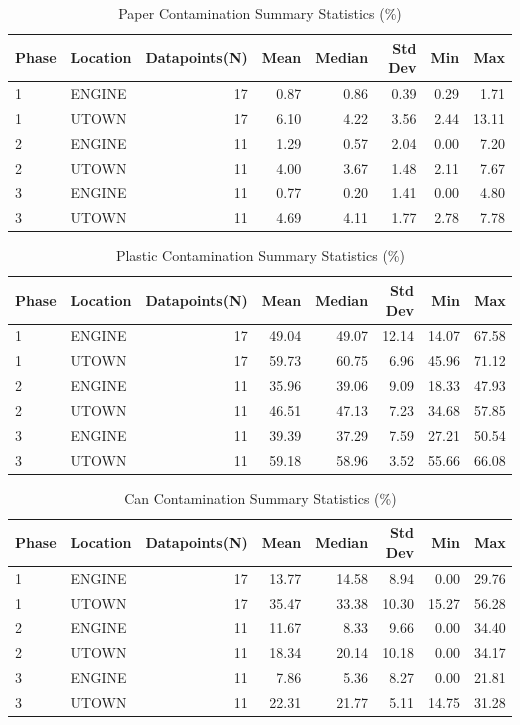 \documentclass[12pt]{article}
\begin{document}
\begin{table}[H]
\centering
\caption{Paper Contamination Summary Statistics (\%)}
\label{tab:paper}
\small
\begin{tabular}{llrrrrrr}
\toprule
Phase & Location & Datapoints(N) & Mean & Median & Std Dev & Min & Max \\
\midrule
1 & ENGINE & 17 & 0.87 & 0.86 & 0.39 & 0.29 & 1.71 \\
1 & UTOWN & 17 & 6.10 & 4.22 & 3.56 & 2.44 & 13.11 \\
2 & ENGINE & 11 & 1.29 & 0.57 & 2.04 & 0.00 & 7.20 \\
2 & UTOWN & 11 & 4.00 & 3.67 & 1.48 & 2.11 & 7.67 \\
3 & ENGINE & 11 & 0.77 & 0.20 & 1.41 & 0.00 & 4.80 \\
3 & UTOWN & 11 & 4.69 & 4.11 & 1.77 & 2.78 & 7.78 \\
\bottomrule
\end{tabular}
\end{table}

\begin{table}[H]
\centering
\caption{Plastic Contamination Summary Statistics (\%)}
\label{tab:plastic}
\small
\begin{tabular}{llrrrrrr}
\toprule
Phase & Location & Datapoints(N) & Mean & Median & Std Dev & Min & Max \\
\midrule
1 & ENGINE & 17 & 49.04 & 49.07 & 12.14 & 14.07 & 67.58 \\
1 & UTOWN & 17 & 59.73 & 60.75 & 6.96 & 45.96 & 71.12 \\
2 & ENGINE & 11 & 35.96 & 39.06 & 9.09 & 18.33 & 47.93 \\
2 & UTOWN & 11 & 46.51 & 47.13 & 7.23 & 34.68 & 57.85 \\
3 & ENGINE & 11 & 39.39 & 37.29 & 7.59 & 27.21 & 50.54 \\
3 & UTOWN & 11 & 59.18 & 58.96 & 3.52 & 55.66 & 66.08 \\
\bottomrule
\end{tabular}
\end{table}

\begin{table}[H]
\centering
\caption{Can Contamination Summary Statistics (\%)}
\label{tab:cans}
\small
\begin{tabular}{llrrrrrr}
\toprule
Phase & Location & Datapoints(N) & Mean & Median & Std Dev & Min & Max \\
\midrule
1 & ENGINE & 17 & 13.77 & 14.58 & 8.94 & 0.00 & 29.76 \\
1 & UTOWN & 17 & 35.47 & 33.38 & 10.30 & 15.27 & 56.28 \\
2 & ENGINE & 11 & 11.67 & 8.33 & 9.66 & 0.00 & 34.40 \\
2 & UTOWN & 11 & 18.34 & 20.14 & 10.18 & 0.00 & 34.17 \\
3 & ENGINE & 11 & 7.86 & 5.36 & 8.27 & 0.00 & 21.81 \\
3 & UTOWN & 11 & 22.31 & 21.77 & 5.11 & 14.75 & 31.28 \\
\bottomrule
\end{tabular}
\end{table}
\end{document}
